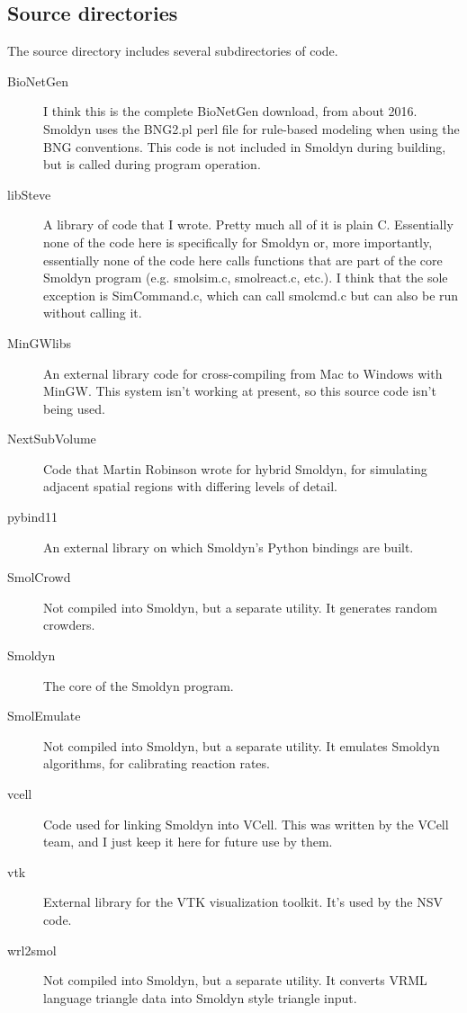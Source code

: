 \documentclass {book}
\begin{document}
\subsection{Source directories}

The source directory includes several subdirectories of code.

\begin{description}

\item[BioNetGen] I think this is the complete BioNetGen download, from about 2016. Smoldyn uses the BNG2.pl perl file for rule-based modeling when using the BNG conventions. This code is not included in Smoldyn during building, but is called during program operation.

\item[libSteve] A library of code that I wrote. Pretty much all of it is plain C. Essentially none of the code here is specifically for Smoldyn or, more importantly, essentially none of the code here calls functions that are part of the core Smoldyn program (e.g. smolsim.c, smolreact.c, etc.). I think that the sole exception is SimCommand.c, which can call smolcmd.c but can also be run without calling it.

\item[MinGWlibs] An external library code for cross-compiling from Mac to Windows with MinGW. This system isn't working at present, so this source code isn't being used.

\item[NextSubVolume] Code that Martin Robinson wrote for hybrid Smoldyn, for simulating adjacent spatial regions with differing levels of detail.

\item[pybind11] An external library on which Smoldyn's Python bindings are built.

\item[SmolCrowd] Not compiled into Smoldyn, but a separate utility. It generates random crowders.

\item[Smoldyn] The core of the Smoldyn program.

\item[SmolEmulate] Not compiled into Smoldyn, but a separate utility. It emulates Smoldyn algorithms, for calibrating reaction rates.

\item[vcell] Code used for linking Smoldyn into VCell. This was written by the VCell team, and I just keep it here for future use by them.

\item[vtk] External library for the VTK visualization toolkit. It's used by the NSV code.

\item[wrl2smol] Not compiled into Smoldyn, but a separate utility. It converts VRML language triangle data into Smoldyn style triangle input.

\end{description}
\end{document}
